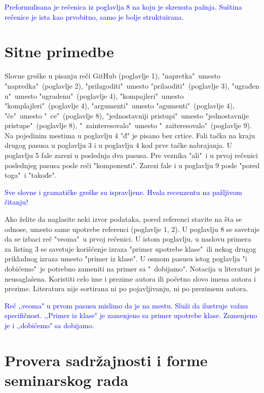 \documentclass[a4paper]{report}
\newcommand{\odgovor}[1]{\textcolor{blue}{#1}}
\begin{document}
\odgovor{Preformulisana je rečenica iz poglavlja 8 na koju je skrenuta pažnja. Suština rečenice je ista kao prvobitno, samo je bolje struktuirana.}

\section{Sitne primedbe}
Slovne greške u pisanju reči GitHub (poglavlje 1), "napretka"\ umesto "napredka"\ (poglavlje 2), "prilagoditi"\ umesto "prilaoditi"\ (poglavlje 3), "ugrađen u"\ umesto "ugradenu"\ (poglavlje 4), "kompajleri"\ umesto "komplajleri"\ (poglavlje 4), "argumenti"\ umesto "agumenti"\ (poglavlje 4), "će"\ umesto "\ ce"\ (poglavlje 8), "jednostavniji pristupi"\ umesto "jednostavnije pristupe"\ (poglavlje 8), "\ zainteresovalo"\ umesto "\ zaiteresovalo"\ (poglavlje 9). Na pojedinim mestima u poglavlju 4 "đ" je pisano bez crtice. Fali tačka na kraju drugog pasusa u poglavlju 3 i u poglavlju 4 kod prve tačke nabrajanja. U poglavlju 5 fale zarezi u poslednja dva pasusa. Pre veznika "ali"\ i u prvoj rečenici poslednjeg pasusa posle reči "komponenti". Zarezi fale i u poglavlju 9 posle "pored toga"\ i "takođe".

\odgovor{Sve slovne i gramatičke greške su ispravljene. Hvala recenzentu na pažljivom čitanju!}

Ako želite da naglasite neki izvor podataka, pored referenci stavite na šta se odnose, umesto same upotrebe referenci (poglavlje 1, 2). U poglavlju 8 se savetuje da se izbaci reč "veoma"\ u prvoj rečenici. U istom poglavlju, u naslovu primera za listing 3 se savetuje korišćenje izraza "primer upotrebe klase"\ ili nekog drugog prikladnog izraza umesto "primer iz klase". U osmom pasusu istog poglavlja "i dobićemo"\ je potrebno zameniti na primer sa "\ dobijamo".
Notacija u literaturi je neusaglašena. Koristiti celo ime i prezime autora ili početno slovo imena autora i prezime. Literatura nije sortirana ni po pojavljivanju, ni po prezimenu autora.

\odgovor{Reč ‚‚veoma" u prvom pasusu mislimo da je na mestu. Služi da ilustruje važnu specifičnost. ‚‚Primer iz klase" je zamenjeno sa
primer upotrebe klase. Zamenjeno je i ‚‚dobićemo" sa dobijamo.}

\section{Provera sadržajnosti i forme seminarskog rada}
\end{document}
